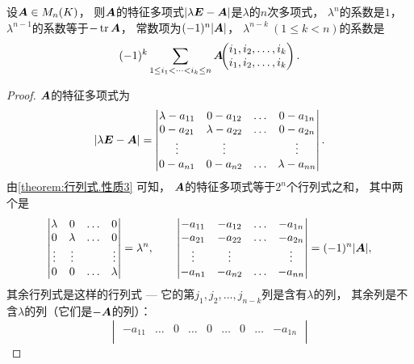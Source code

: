 \begin{proposition}
设\(\boldsymbol{A} \in M_n(K)\)，
则\(\boldsymbol{A}\)的特征多项式\(\abs{\lambda\boldsymbol{E}-\boldsymbol{A}}\)是\(\lambda\)的\(n\)次多项式，
\(\lambda^n\)的系数是\(1\)，
\(\lambda^{n-1}\)的系数等于\(-\tr\boldsymbol{A}\)，
常数项为\((-1)^n \abs{\boldsymbol{A}}\)，
\(\lambda^{n-k}\ (1\leq k<n)\)的系数是\begin{equation*}
	(-1)^k \sum_{1 \leq i_1 < \dotsb < i_k \leq n} \boldsymbol{A}\kern-3.8pt\begin{pmatrix}
		i_1,i_2,\dotsc,i_k \\
		i_1,i_2,\dotsc,i_k
	\end{pmatrix}.
\end{equation*}
\begin{proof}
\(\boldsymbol{A}\)的特征多项式为\begin{equation*}
	\abs{\lambda\boldsymbol{E}-\boldsymbol{A}}
	= \begin{vmatrix}
		\lambda-a_{11} & 0-a_{12} & \dots & 0-a_{1n} \\
		0-a_{21} & \lambda-a_{22} & \dots & 0-a_{2n} \\
		\vdots & \vdots && \vdots \\
		0-a_{n1} & 0-a_{n2} & \dots & \lambda-a_{nn}
	\end{vmatrix}.
\end{equation*}
由\cref{theorem:行列式.性质3} 可知，
\(\boldsymbol{A}\)的特征多项式等于\(2^n\)个行列式之和，
其中两个是\begin{equation*}
	\begin{vmatrix}
		\lambda & 0 & \dots & 0 \\
		0 & \lambda & \dots & 0 \\
		\vdots & \vdots && \vdots \\
		0 & 0 & \dots & \lambda
	\end{vmatrix}
	= \lambda^n,
	\qquad
	\begin{vmatrix}
		-a_{11} & -a_{12} & \dots & -a_{1n} \\
		-a_{21} & -a_{22} & \dots & -a_{2n} \\
		\vdots & \vdots && \vdots \\
		-a_{n1} & -a_{n2} & \dots & -a_{nn}
	\end{vmatrix}
	= (-1)^n \abs{\boldsymbol{A}},
\end{equation*}
其余行列式是这样的行列式 --- 它的第\(j_1,j_2,\dotsc,j_{n-k}\)列是含有\(\lambda\)的列，
其余列是不含\(\lambda\)的列（它们是\(-\boldsymbol{A}\)的列）：\begin{equation*}
	\begin{vmatrix}
		-a_{11} & \dots & 0 & \dots & 0 & \dots & 0 & \dots & -a_{1n} \\

\end{vmatrix}
\end{equation*}
\end{proof}
\end{proposition}
